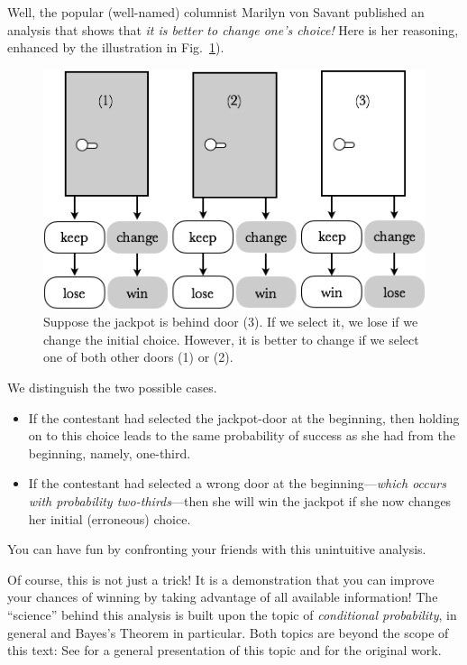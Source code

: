 Well, the popular (well-named) columnist Marilyn von Savant
 published an analysis that shows that
{\em it is better to change one's choice!}  Here is her reasoning,
enhanced by the illustration in Fig.~\ref{fig:MonthyHall-2}).
\begin{figure}[htb]
\begin{center}
        \includegraphics[scale=0.4]{FiguresMaths/MonthyHall}
        \caption{Suppose the jackpot is behind door (3). 
        If we select it, we lose if we change the initial choice.
        However, it is better to change if we select one of both other doors (1) or (2).}
        \label{fig:MonthyHall-2}
\end{center}
\end{figure}
We distinguish the two possible cases.
\begin{itemize}
\item
If the contestant had selected the jackpot-door at the beginning, then
holding on to this choice leads to the same probability of success as
she had from the beginning, namely, one-third.
\item
If the contestant had selected a wrong door at the beginning---{\em which
occurs with probability two-thirds}---then she will win the jackpot if
she now changes her initial (erroneous) choice.
\end{itemize}
You can have fun by confronting your friends with this unintuitive
analysis.

\medskip

Of course, this is not just a trick!  It is a demonstration that you
can improve your chances of winning by taking advantage of all
available information!  The ``science'' behind this analysis is built
upon the topic of {\em conditional probability},
 in general and Bayes's Theorem in
particular.   Both topics are beyond the scope
of this text: See \cite{Lee12} for a general presentation of this
topic and \cite{Bayes} for the original work.


